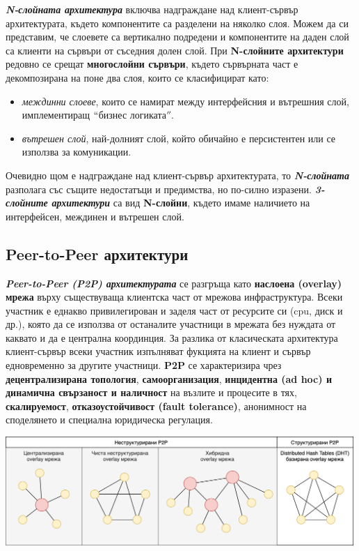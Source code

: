 \documentclass[fleqn,12pt]{article}
\begin{document}
\textbf{\textit{N-слойната архитектура}} включва надграждане над клиент-сървър архитектурата, където компонентите са разделени на няколко слоя.
Можем да си представим, че слоевете са вертикално подредени и компонентите на даден слой са клиенти на сървъри от съседния долен слой.
\bigbreak
При \textbf{N-слойните архитектури} редовно се срещат \textbf{многослойни сървъри}, където сървърната част е декомпозирана на поне два слоя, които се класифицират като:
\begin{itemize}
    \item \textit{междинни слоеве}, които се намират между интерфейсния и вътрешния слой, имплементиращ $``$бизнес логиката$''$.
    \item \textit{вътрешен слой}, най-долният слой, който обичайно е персистентен или се използва за комуникации. 
\end{itemize}

Очевидно щом е надграждане над клиент-сървър архитектурата, то \textbf{\textit{N-слойната}} разполага със същите недостатъци и предимства, но по-силно изразени.
\bigbreak
\textbf{\textit{3-слойните архитектури}} са вид \textbf{N-слойни}, където имаме наличието на интерфейсен, междинен и вътрешен слой.

\subsection{Peer-to-Peer архитектури}

\textbf{\textit{Peer-to-Peer (P2P) архитектурата}} се разгръща като \textbf{наслоена (overlay) мрежа} върху съществуваща клиентска част от мрежова инфраструктура.
Всеки участник е еднакво привилегирован и заделя част от ресурсите си (cpu, диск и др.), която да се използва от останалите участници в мрежата без нуждата от каквато и да е централна координция.
За разлика от класическата архитектура клиент-сървър всеки участник изпълняват фукцията на клиент и сървър едновременно за другите участници.
\textbf{P2P} се характеризира чрез \textbf{децентрализирана топология}, \textbf{самоорганизация}, \textbf{инцидентна (ad hoc) и динамична свързаност и наличност} на възлите и процесите в тях, \textbf{скалируемост}, \textbf{отказоустойчивост (fault tolerance)}, анонимност на споделянето и специална юридическа регулация.

\begin{center} \includegraphics[width=500px]{p2p_overlay_topologies.png} \end{center}
\end{document}
